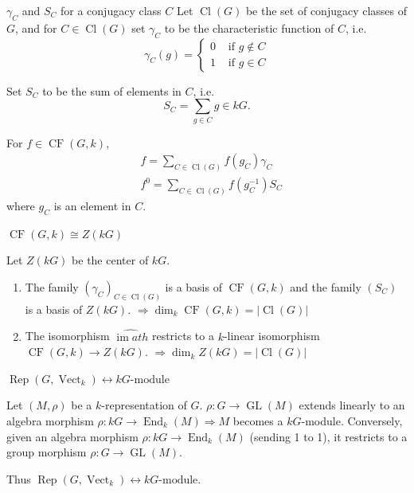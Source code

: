 \documentclass[11pt, a4paper]{report}
\begin{document}
\begin{definition}
$\gamma_{C}$ and $S_{C}$ for a conjugacy class $C$
Let $\operatorname{Cl}(G)$ be the set of conjugacy classes of $G$, and for $C \in \operatorname{Cl}(G)$ set $\gamma_{C}$ to be the characteristic function of $C$, i.e.
\[
\gamma_{C}(g)= \begin{cases}0 & \text { if } g \notin C \\ 1 & \text { if } g \in C\end{cases}
\]

Set $S_{C}$ to be the sum of elements in $C$, i.e.
\[
S_{C}=\sum_{g \in C} g \in k G .
\]

For $f \in \operatorname{CF}(G, k)$,
\[
\begin{aligned}
& f=\sum_{C \in \operatorname{Cl}(G)} f\left(g_{C}\right) \gamma_{C} \\
& f^{0}=\sum_{C \in \operatorname{Cl}(G)} f\left(g_{C}^{-1}\right) S_{C}
\end{aligned}
\]
where $g_{C}$ is an element in $C$.

\end{definition}

\begin{lemma}
$\operatorname{CF}(G, k) \cong Z(k G)$

Let $Z(k G)$ be the center of $k G$.
\begin{enumerate}
\item The family $\left(\gamma_{C}\right)_{C \in \operatorname{Cl}(G)}$ is a basis of $\operatorname{CF}(G, k)$ and the family $\left(S_{C}\right)$ is a basis of $Z(k G)$.
$\Rightarrow \operatorname{dim}_{k} \operatorname{CF}(G, k)=|\operatorname{Cl}(G)|$
\item The isomorphism $\hat{\operatorname{im}ath}$ restricts to a $k$-linear isomorphism $\operatorname{CF}(G, k) \rightarrow Z(k G)$.
$\Rightarrow \operatorname{dim}_{k} Z(k G)=|\operatorname{Cl}(G)|$
\end{enumerate}
\end{lemma}

\begin{proposition}
$\operatorname{Rep}\left(G, \operatorname{Vect}_{k}\right) \leftrightarrow k G\text{-module}$

Let $(M, \rho)$ be a $k$-representation of $G$. $\rho: G \rightarrow \operatorname{GL}(M)$ extends linearly to an algebra morphism $\rho: k G \rightarrow \operatorname{End}_{k}(M) \Rightarrow M$ becomes a $k G$-module. Conversely, given an algebra morphism $\rho: k G \rightarrow \operatorname{End}_{k}(M)$ (sending 1 to 1), it restricts to a group morphism $\rho: G \rightarrow \operatorname{GL}(M)$.

Thus $\operatorname{Rep}\left(G, \operatorname{Vect}_{k}\right) \leftrightarrow k G\text{-module}$.
\end{proposition}
\end{document}
